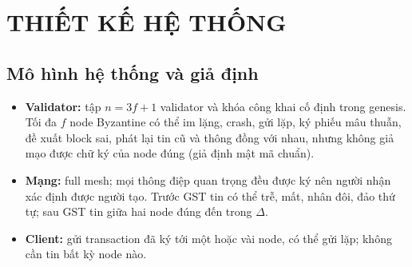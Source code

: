 \documentclass[a4paper,12pt]{article}
\begin{document}
\section{THIẾT KẾ HỆ THỐNG}
\subsection{Mô hình hệ thống và giả định}
\begin{itemize}
\item \textbf{Validator:} tập $n = 3f+1$ validator và khóa công khai cố định trong genesis. Tối đa $f$ node
Byzantine có thể im lặng, crash, gửi lặp, ký phiếu mâu thuẫn, đề xuất block sai, phát lại tin cũ và thông
đồng với nhau, nhưng không giả mạo được chữ ký của node đúng (giả định mật mã chuẩn).
\item \textbf{Mạng:} full mesh; mọi thông điệp quan trọng đều được ký nên người nhận xác định được người tạo.
Trước GST tin có thể trễ, mất, nhân đôi, đảo thứ tự; sau GST tin giữa hai node đúng đến trong $\Delta$.
\item \textbf{Client:} gửi transaction đã ký tới một hoặc vài node, có thể gửi lặp; không cần tin bất kỳ node nào.
\end{itemize}
\end{document}
